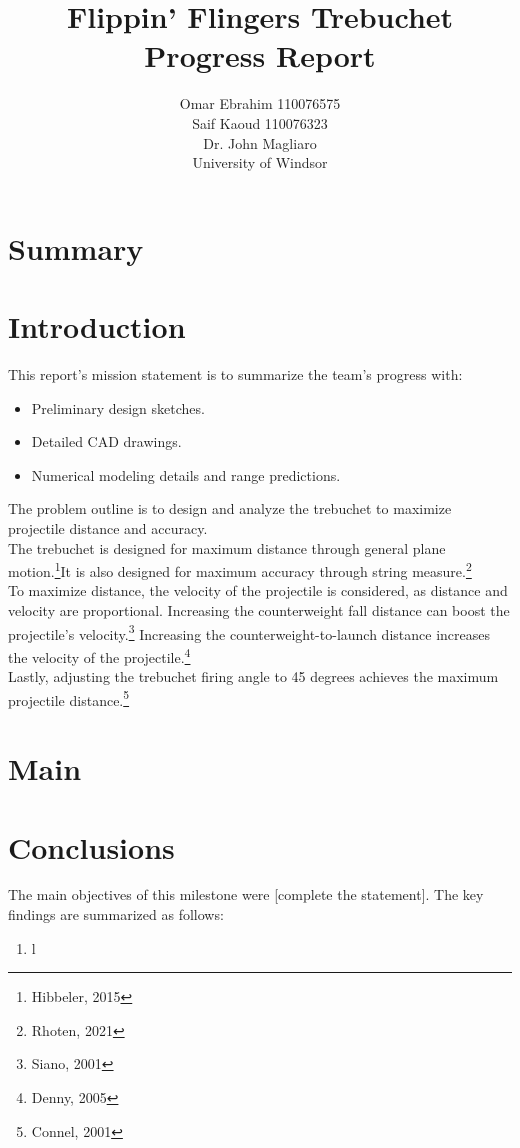 \documentclass[12pt, titlepage]{article}
\title{Flippin' Flingers Trebuchet Progress Report}
\author{Omar Ebrahim 110076575\\Saif Kaoud 110076323\\[10pt] Dr. John Magliaro\\
University of Windsor}
\begin{document}
    \maketitle
    \section{Summary}
    \newpage
    \tableofcontents \newpage
    \listoffigures \newpage
    \listoftables \newpage
    \section{Introduction}
    This report's mission statement is to summarize the team's progress with:
    \begin{itemize}
        \item Preliminary design sketches.
        \item Detailed CAD drawings.
        \item Numerical modeling details and range predictions.
    \end{itemize}
    The problem outline is to design and analyze the trebuchet to maximize
    projectile distance and accuracy.\\[10pt]
    The trebuchet is designed for maximum distance through general
    plane motion.\footnote{Hibbeler, 2015}It is also designed for maximum 
    accuracy through string measure.\footnote{Rhoten, 2021}\\[10pt]
    To maximize distance, the velocity of the projectile is considered, as
    distance and velocity are proportional. Increasing the counterweight 
    fall distance can boost the projectile's velocity.\footnote{Siano, 2001}
    Increasing the counterweight-to-launch distance increases the velocity 
    of the projectile.\footnote{Denny, 2005}\\[10pt]
    Lastly, adjusting the trebuchet firing angle to 
    45 degrees achieves the maximum projectile distance.\footnote{Connel, 2001}
    \newpage
    \section{Main}
    \newpage
    \section{Conclusions}
    The main objectives of this milestone were [complete the statement].
    The key findings are summarized as follows:
    \begin{enumerate}
        \item l
    \end{enumerate}
    \newpage
\end{document}
